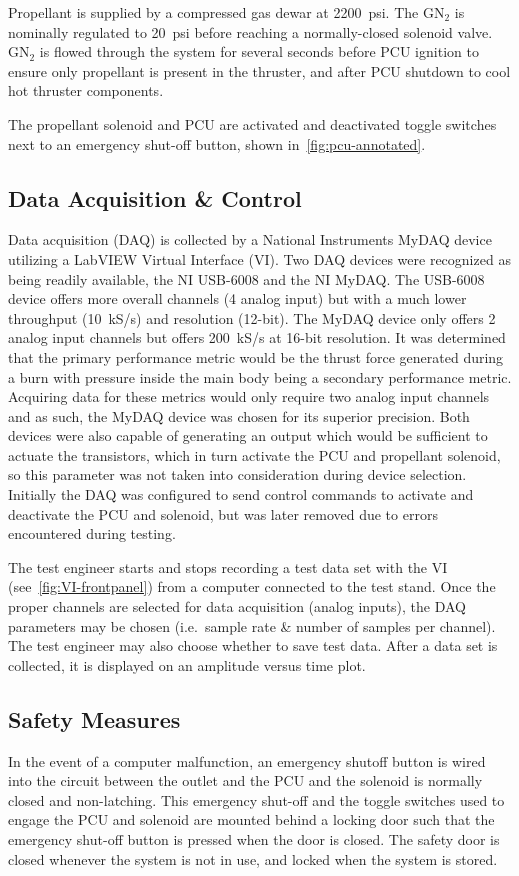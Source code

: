 \documentclass[journal]{IEEEtran}
\begin{document}
Propellant is supplied by a compressed gas dewar at \SI{2200}{psi}.
The GN$_2$ is nominally regulated to \SI{20}{psi} before reaching a normally-closed solenoid valve.
GN$_2$ is flowed through the system for several seconds before PCU ignition to ensure only propellant is present in the thruster, and after PCU shutdown to cool hot thruster components.

The propellant solenoid and PCU are activated and deactivated toggle switches next to an emergency shut-off button, shown in~\autoref{fig:pcu-annotated}.

\subsection{Data Acquisition \& Control}

Data acquisition (DAQ) is collected by a National Instruments MyDAQ device utilizing a LabVIEW Virtual Interface (VI).
Two DAQ devices were recognized as being readily available, the NI USB-6008 and the NI MyDAQ.\@
The USB-6008 device offers more overall channels (4 analog input) but with a much lower throughput (\SI{10}{kS/s}) and resolution (12-bit).
The MyDAQ device only offers 2 analog input channels but offers \SI{200}{kS/s} at 16-bit resolution. It was determined that the primary performance metric would be the thrust force generated during a burn with pressure inside the main body being a secondary performance metric.
Acquiring data for these metrics would only require two analog input channels and as such, the MyDAQ device was chosen for its superior precision.
Both devices were also capable of generating an output which would be sufficient to actuate the transistors, which in turn activate the PCU and propellant solenoid, so this parameter was not taken into consideration during device selection.
Initially the DAQ was configured to send control commands to activate and deactivate the PCU and solenoid, but was later removed due to errors encountered during testing.

The test engineer starts and stops recording a test data set with the VI (see~\autoref{fig:VI-frontpanel}) from a computer connected to the test stand.
Once the proper channels are selected for data acquisition (analog inputs), the DAQ parameters may be chosen (i.e.\ sample rate \& number of samples per channel).
The test engineer may also choose whether to save test data.
After a data set is collected, it is displayed on an amplitude versus time plot.

\subsection{Safety Measures}
In the event of a computer malfunction, an emergency shutoff button is wired into the circuit between the outlet and the PCU and the solenoid is normally closed and non-latching.
This emergency shut-off and the toggle switches used to engage the PCU and solenoid are mounted behind a locking door such that the emergency shut-off button is pressed when the door is closed.
The safety door is closed whenever the system is not in use, and locked when the system is stored.
\end{document}
